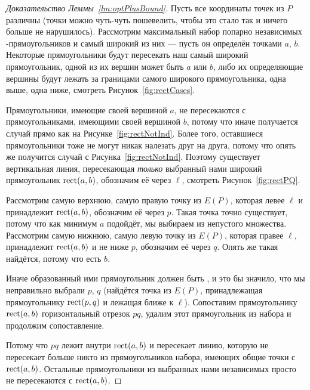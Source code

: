 \begin{proof}[Доказательство Леммы~\ref{lm:optPlusBound}]
Пусть все координаты точек из $P$ различны (точки можно чуть-чуть пошевелить, чтобы это стало так и ничего больше не нарушилось). Рассмотрим максимальный набор попарно независимых \tpl-прямоугольников и самый широкий из них — пусть он определён точками $a$, $b$. Некоторые прямоугольники будут пересекать наш самый широкий прямоугольник, одной из их вершин может быть $a$ или $b$, либо их определяющие вершины будут лежать за границами самого широкого прямоугольника, одна выше, одна ниже, смотреть Рисунок~\ref{fig:rectCases}.



Прямоугольники, имеющие своей вершиной $a$, не пересекаются с прямоугольниками, имеющими своей вершиной $b$, потому что иначе получается случай прямо как на Рисунке~\ref{fig:rectNotInd}. Более того, оставшиеся прямоугольники тоже не могут никак налезать друг на друга, потому что опять же получится случай с Рисунка~\ref{fig:rectNotInd}. Поэтому существует вертикальная линия, пересекающая {\it только} выбранный нами широкий прямоугольник $\operatorname{rect} (a,b)$, обозначим её через $\ell$, смотреть Рисунок~\ref{fig:rectPQ}.

Рассмотрим самую верхнюю, самую правую точку из $E(P)$, которая левее $\ell$ и принадлежит $\operatorname{rect} (a,b)$, обозначим её через $p$. Такая точка точно существует, потому что как минимум $a$ подойдёт, мы выбираем из непустого множества. Рассмотрим самую нижнюю, самую левую точку из $E(P)$, которая правее $\ell$, принадлежит $\operatorname{rect} (a,b)$ и не ниже $p$, обозначим её через $q$. Опять же такая найдётся, потому что есть $b$.


Иначе образованный ими прямоугольник должен быть \arbs, и это бы значило, что мы неправильно выбрали $p$, $q$ (найдётся точка из $E(P)$, принадлежащая прямоугольнику $\operatorname{rect} (p,q)$ и лежащая ближе к $\ell$). Сопоставим прямоугольнику $\operatorname{rect} (a,b)$ горизонтальный отрезок $pq$, удалим этот прямоугольник из набора и продолжим сопоставление.


Потому что $pq$ лежит внутри $\operatorname{rect}(a,b)$ и пересекает линию, которую не пересекает больше никто из прямоугольников набора, имеющих общие точки с $\operatorname{rect}(a,b)$. Остальные прямоугольники из выбранных нами независимых просто не пересекаются с $\operatorname{rect}(a,b)$.


\end{proof}
